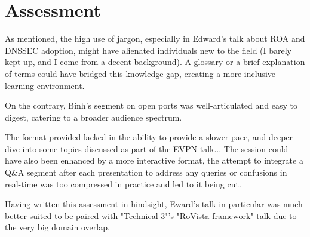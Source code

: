 \documentclass[twocolumn]{article}
\begin{document}
\newpage

\section*{Assessment}
As mentioned, the high use of jargon, especially in Edward's talk about ROA and DNSSEC adoption, might have alienated individuals new to the field (I barely kept up, and I come from a decent background). A glossary or a brief explanation of terms could have bridged this knowledge gap, creating a more inclusive learning environment. 

On the contrary, Binh's segment on open ports was well-articulated and easy to digest, catering to a broader audience spectrum. 

The format provided lacked in the ability to provide a slower pace, and deeper dive into some topics discussed as part of the EVPN talk... The session could have also been enhanced by a more interactive format, the attempt to integrate a Q\&A segment after each presentation to address any queries or confusions in real-time was too compressed in practice and led to it being cut. 

Having written this assessment in hindsight, Eward's talk in particular was much better suited to be paired with "Technical 3"'s "RoVista framework" talk due to the very big domain overlap.
\end{document}
